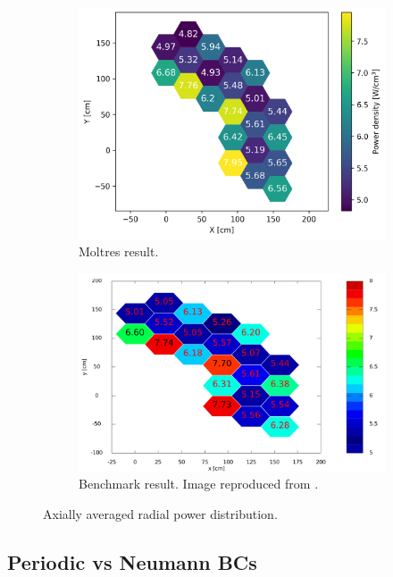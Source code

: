 \documentclass[11pt,letterpaper]{article}
\begin{document}
\begin{figure}[htbp!]
  \centering
  \begin{subfigure}[t]{0.4\textwidth}
    \centering
    \includegraphics[width=\linewidth]{figures/3D-fullcore26G-radialpower}
    \caption{Moltres result.}
  \end{subfigure}
  \begin{subfigure}[t]{0.4\textwidth}
    \centering
    \includegraphics[width=\linewidth]{figures/benchmark-radialpower}
    \caption{Benchmark result. Image reproduced from \cite{oecd_nea_coupled_2020}.}
  \end{subfigure}
  \hfill
  \caption{Axially averaged radial power distribution.}
  \label{fig:radialpower}
\end{figure}

\subsection{Periodic vs Neumann BCs}
\end{document}
